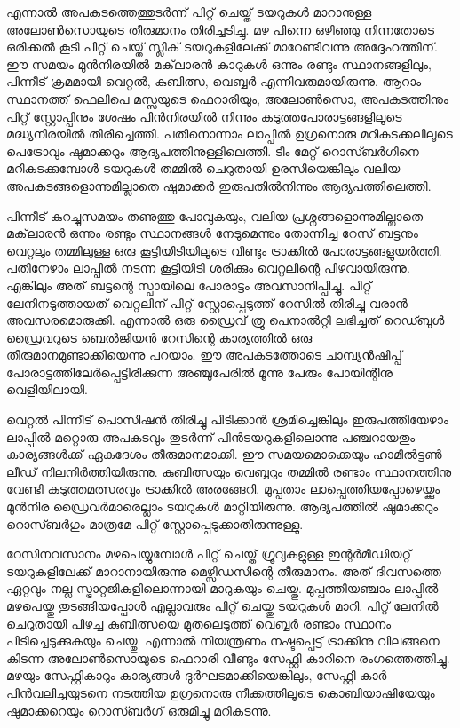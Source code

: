 എന്നാല്‍ അപകടത്തെത്തുടര്‍ന്ന് പിറ്റ് ചെയ്ത് ടയറുകള്‍ മാറാനുള്ള അലോണ്‍സൊയുടെ തീരുമാനം തിരിച്ചടിച്ചു. മഴ 
പിന്നെ ഒഴിഞ്ഞു നിന്നതോടെ ഒരിക്കല്‍ കൂടി പിറ്റ് ചെയ്ത് സ്ലിക് ടയറുകളിലേക്ക് മാറേണ്ടിവന്നു അദ്ദേഹത്തിന്. ഈ 
സമയം മുന്‍നിരയില്‍ മക്‌ലാരന്‍ കാറുകള്‍ ഒന്നും രണ്ടും സ്ഥാനങ്ങളിലും, പിന്നീട് ക്രമമായി വെറ്റല്‍, കുബിത്സ, 
വെബ്ബര്‍ എന്നിവരുമായിരുന്നു. ആറാം സ്ഥാനത്ത് ഫെലിപെ മസ്സയുടെ ഫെറാരിയും, അലോണ്‍സൊ, അപകടത്തിനും 
പിറ്റ് സ്റ്റോപ്പിനും ശേഷം പിന്‍നിരയില്‍ നിന്നും കടുത്തപോരാട്ടങ്ങളിലൂടെ മദ്ധ്യനിരയില്‍ തിരിച്ചെത്തി. പതിനൊന്നാം 
ലാപ്പില്‍ ഉഗ്രനൊരു മറികടക്കലിലൂടെ പെട്രോവും ഷുമാക്കറും ആദ്യപത്തിനുള്ളിലെത്തി. ടീം മേറ്റ് റൊസ്ബര്‍ഗിനെ 
മറികടക്കുമ്പോള്‍ ടയറുകള്‍ തമ്മില്‍ ചെറുതായി ഉരസിയെങ്കിലും വലിയ അപകടങ്ങളൊന്നുമില്ലാതെ ഷുമാക്കര്‍ 
ഇരുപതില്‍നിന്നും ആദ്യപത്തിലെത്തി.

പിന്നീട് കുറച്ചുസമയം തണുത്തു പോവുകയും, വലിയ പ്രശ്നങ്ങളൊന്നുമില്ലാതെ മക്‌ലാരന്‍ ഒന്നും രണ്ടും സ്ഥാനങ്ങള്‍ 
നേടുമെന്നും തോന്നിച്ച റേസ് ബട്ടനും വെറ്റലും തമ്മിലുള്ള ഒരു കൂട്ടിയിടിയിലൂടെ വീണ്ടും ട്രാക്കില്‍ പോരാട്ടങ്ങളുയര്‍ത്തി. 
പതിനേഴാം ലാപ്പില്‍ നടന്ന കൂട്ടിയിടി ശരിക്കും വെറ്റലിന്റെ പിഴവായിരുന്നു. എങ്കിലും അത് ബട്ടന്റെ സ്പായിലെ പോരാട്ടം 
അവസാനിപ്പിച്ചു. പിറ്റ് ലേനിനടുത്തായത് വെറ്റലിന് പിറ്റ് സ്റ്റോപ്പെടുത്ത് റേസില്‍ തിരിച്ചു വരാന്‍ അവസരമൊരുക്കി. 
എന്നാല്‍ ഒരു ഡ്രൈവ് ത്രൂ പെനാല്‍റ്റി ലഭിച്ചത് റെഡ്ബുള്‍ ഡ്രൈവറുടെ ബെല്‍ജിയന്‍ റേസിന്റെ കാര്യത്തില്‍ ഒരു 
തീരുമാനമുണ്ടാക്കിയെന്നു പറയാം. ഈ അപകടത്തോടെ ചാമ്പ്യന്‍ഷിപ്പ് പോരാട്ടത്തിലേര്‍പ്പെട്ടിരിക്കുന്ന അഞ്ചുപേരില്‍ 
മൂന്നു പേരും പോയിന്റിനു വെളിയിലായി.

വെറ്റല്‍ പിന്നീട് പൊസിഷന്‍ തിരിച്ചു പിടിക്കാന്‍ ശ്രമിച്ചെങ്കിലും ഇരുപത്തിയേഴാം ലാപ്പില്‍ മറ്റൊരു അപകടവും തുടര്‍ന്ന് 
പിന്‍ടയറുകളിലൊന്നു പഞ്ചറായതും കാര്യങ്ങള്‍ക്ക് ഏകദേശം തീരുമാനമാക്കി. ഈ സമയമൊക്കെയും ഹാമില്‍ട്ടണ്‍ ലീഡ് 
നിലനിര്‍ത്തിയിരുന്നു. കുബിത്സയും വെബ്ബറും തമ്മില്‍ രണ്ടാം സ്ഥാനത്തിനു വേണ്ടി കടുത്തമത്സരവും ട്രാക്കില്‍ അരങ്ങേറി. 
മുപ്പതാം ലാപ്പെത്തിയപ്പോഴെയ്ക്കും മുന്‍നിര ഡ്രൈവര്‍മാരെല്ലാം ടയറുകള്‍ മാറ്റിയിരുന്നു. ആദ്യപത്തില്‍ ഷുമാക്കറും 
റൊസ്ബര്‍ഗും മാത്രമേ പിറ്റ് സ്റ്റോപ്പെടുക്കാതിരുന്നുള്ളു.

റേസിനവസാനം മഴപെയ്യുമ്പോള്‍ പിറ്റ് ചെയ്ത് ഗ്രൂവുകളുള്ള ഇന്റര്‍മീഡിയറ്റ് ടയറുകളിലേക്ക് മാറാനായിരുന്നു 
മെഴ്സിഡസിന്റെ തീരുമാനം. അത് ദിവസത്തെ ഏറ്റവും നല്ല സ്ട്രാറ്റജികളിലൊന്നായി മാറുകയും ചെയ്തു. മുപ്പത്തിയഞ്ചാം 
ലാപ്പില്‍ മഴപെയ്തു തുടങ്ങിയപ്പോള്‍ എല്ലാവരും പിറ്റ് ചെയ്തു ടയറുകള്‍ മാറി. പിറ്റ് ലേനില്‍ ചെറുതായി പിഴച്ച കുബിത്സയെ 
മുതലെടുത്ത് വെബ്ബര്‍ രണ്ടാം സ്ഥാനം പിടിച്ചെടുക്കുകയും ചെയ്തു. എന്നാല്‍ നിയന്ത്രണം നഷ്ടപ്പെട്ട് ട്രാക്കിനു വിലങ്ങനെ 
കിടന്ന അലോണ്‍സൊയുടെ ഫെറാരി വീണ്ടും സേഫ്റ്റി കാറിനെ രംഗത്തെത്തിച്ചു. മഴയും സേഫ്റ്റികാറും കാര്യങ്ങള്‍ 
ദുര്‍ഘടമാക്കിയെങ്കിലും, സേഫ്റ്റി കാര്‍ പിന്‍വലിച്ചയുടനെ നടത്തിയ ഉഗ്രനൊരു നീക്കത്തിലൂടെ കൊബിയാഷിയേയും 
ഷുമാക്കറെയും റൊസ്ബര്‍ഗ് ഒരുമിച്ചു മറികടന്നു.

